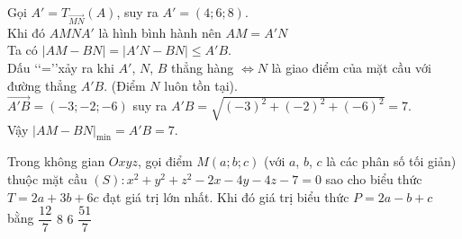\begin{ex}
{		Gọi $A'={T_{\overrightarrow{MN}}}(A)$, suy ra $A'=(4;6;8)$.\\
		Khi đó $AMNA'$ là hình bình hành nên $AM=A'N$\\
		Ta có $\left|AM-BN\right|=\left|A'N-BN\right|\le A'B$.\\
		Dấu \lq\lq =\rq\rq xảy ra khi $A'$, $N$, $B$ thẳng hàng $\Leftrightarrow N$ là giao điểm của mặt cầu với đường thẳng $A'B$. (Điểm $N$ luôn tồn tại).\\
		$\overrightarrow{A'B}=(-3;-2;-6)$ suy ra $A'B=\sqrt{(-3)^2+(-2)^2+(-6)^2}=7$.\\
		Vậy ${{\left|AM-BN\right|}_{\min}}=A'B=7$.}
\end{ex}
\begin{ex}%
	Trong không gian $Oxyz$, gọi điểm $M(a;b;c)$ (với $a$, $b$, $c$ là các phân số tối giản) thuộc mặt cầu $(S)\colon x^2+y^2+z^2-2x-4y-4z-7=0$ sao cho biểu thức $T=2a+3b+6c$ đạt giá trị lớn nhất. Khi đó giá trị biểu thức $P=2a-b+c$ bằng
	\choice
	{$\dfrac{12}{7}$}
	{$8$}
	{\True $6$}
	{$\dfrac{51}{7}$}
\end{ex}
